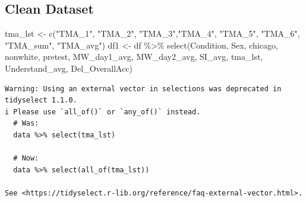 \documentclass[
  letterpaper,
  DIV=11,
  numbers=noendperiod]{scrartcl}
\newenvironment{Shaded}{\begin{snugshade}}{\end{snugshade}}
\newcommand{\FunctionTok}[1]{\textcolor[rgb]{0.28,0.35,0.67}{#1}}
\newcommand{\NormalTok}[1]{\textcolor[rgb]{0.00,0.23,0.31}{#1}}
\newcommand{\OtherTok}[1]{\textcolor[rgb]{0.00,0.23,0.31}{#1}}
\newcommand{\SpecialCharTok}[1]{\textcolor[rgb]{0.37,0.37,0.37}{#1}}
\newcommand{\StringTok}[1]{\textcolor[rgb]{0.13,0.47,0.30}{#1}}
\begin{document}
\hypertarget{clean-dataset}{%
\subsection{Clean Dataset}\label{clean-dataset}}

\begin{Shaded}
\begin{Highlighting}[]
\NormalTok{tma\_lst }\OtherTok{\textless{}{-}} \FunctionTok{c}\NormalTok{(}\StringTok{"TMA\_1"}\NormalTok{, }\StringTok{"TMA\_2"}\NormalTok{, }\StringTok{"TMA\_3"}\NormalTok{,}\StringTok{"TMA\_4"}\NormalTok{, }\StringTok{"TMA\_5"}\NormalTok{, }\StringTok{"TMA\_6"}\NormalTok{,}
             \StringTok{"TMA\_sum"}\NormalTok{, }\StringTok{"TMA\_avg"}\NormalTok{)}
\NormalTok{df1 }\OtherTok{\textless{}{-}}\NormalTok{ df }\SpecialCharTok{\%\textgreater{}\%} \FunctionTok{select}\NormalTok{(Condition, Sex, chicago, nonwhite, pretest,}
\NormalTok{              MW\_day1\_avg, MW\_day2\_avg, SI\_avg, tma\_lst,}
\NormalTok{              Understand\_avg, Del\_OverallAcc)}
\end{Highlighting}
\end{Shaded}

\begin{verbatim}
Warning: Using an external vector in selections was deprecated in tidyselect 1.1.0.
i Please use `all_of()` or `any_of()` instead.
  # Was:
  data %>% select(tma_lst)

  # Now:
  data %>% select(all_of(tma_lst))

See <https://tidyselect.r-lib.org/reference/faq-external-vector.html>.
\end{verbatim}
\end{document}
